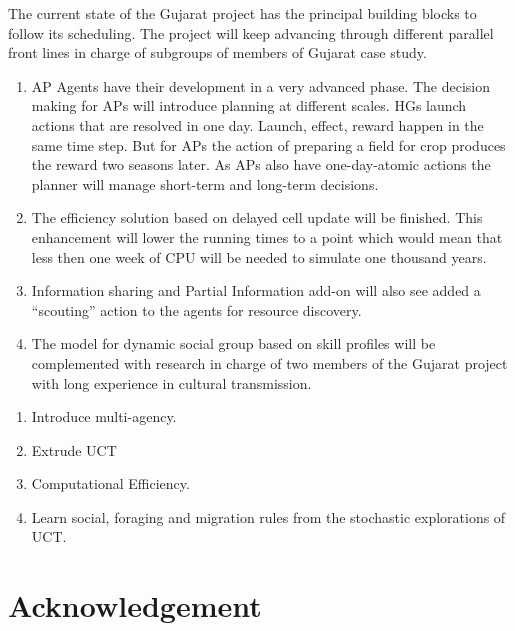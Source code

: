 \documentclass[11pt,oneside,a4paper,openright]{report}
\begin{document}
The current state of the Gujarat project has the principal building blocks to follow its scheduling. 
The project will keep advancing through different parallel front lines in charge of subgroups of members of Gujarat case study. 
\begin{enumerate}

\item AP Agents have their development in a very advanced phase. The decision making for APs will introduce
planning at different scales. HGs launch actions that are resolved in one day. Launch, effect, reward
happen in the same time step. But for APs the action of preparing a field for crop produces the reward
two seasons later. As APs also have one-day-atomic actions the planner will manage short-term and long-term 
decisions.

\item The efficiency solution based on delayed cell update will be finished. This enhancement will lower the
running times to a point which would mean that less then one week of CPU will be needed to simulate one
thousand years.

\item Information sharing and Partial Information add-on will also see added a ``scouting'' action to the 
agents for resource discovery.

\item The model for dynamic social group based on skill profiles will be complemented with research in
charge of two members of the Gujarat project with long experience in cultural transmission.


\end{enumerate}

\begin{enumerate}

	\item Introduce multi-agency.
	
	\item Extrude UCT
	
	\item Computational Efficiency.
	
	\item Learn social, foraging and migration rules from the stochastic explorations of UCT.
	
\end{enumerate}




\chapter{Acknowledgement}
\end{document}
